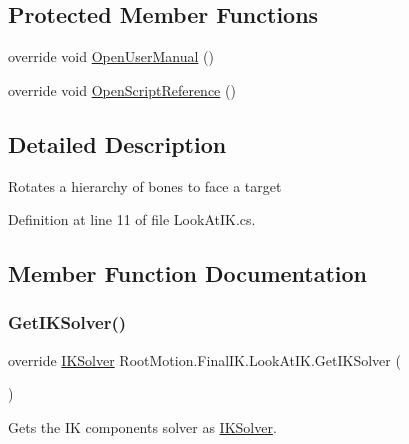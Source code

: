 \subsection*{Protected Member Functions}
\begin{DoxyCompactItemize}
\item 
override void \mbox{\hyperlink{class_root_motion_1_1_final_i_k_1_1_look_at_i_k_abdc32a69392d71c9ce0f1c68778251a5}{Open\+User\+Manual}} ()
\item 
override void \mbox{\hyperlink{class_root_motion_1_1_final_i_k_1_1_look_at_i_k_a1bab9ccb38d81344fe51e00639efaac1}{Open\+Script\+Reference}} ()
\end{DoxyCompactItemize}


\subsection{Detailed Description}
Rotates a hierarchy of bones to face a target 



Definition at line 11 of file Look\+At\+I\+K.\+cs.



\subsection{Member Function Documentation}
\mbox{\label{class_root_motion_1_1_final_i_k_1_1_look_at_i_k_a9a328d936ed493a056797c85b5e8f9dd}} 
\subsubsection{\texorpdfstring{Get\+I\+K\+Solver()}{GetIKSolver()}}
{\footnotesize\ttfamily override \mbox{\hyperlink{class_root_motion_1_1_final_i_k_1_1_i_k_solver}{I\+K\+Solver}} Root\+Motion.\+Final\+I\+K.\+Look\+At\+I\+K.\+Get\+I\+K\+Solver (\begin{DoxyParamCaption}{ }\end{DoxyParamCaption})\hspace{0.3cm}{\ttfamily [virtual]}}



Gets the IK component\textquotesingle{}s solver as \mbox{\hyperlink{class_root_motion_1_1_final_i_k_1_1_i_k_solver}{I\+K\+Solver}}. 



